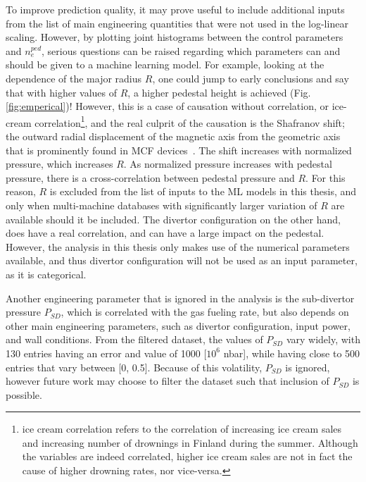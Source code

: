 \documentclass[a4paper, twoside, final, 12pt]{article}
\begin{document}
To improve prediction quality, it may prove useful to include additional inputs from the list of main engineering quantities that were not used in the log-linear scaling.
However, by plotting joint histograms between the control parameters and $n_e^{ped}$, serious questions can be raised regarding which parameters can and should be given to a machine learning model.
For example, looking at the dependence of the major radius $R$, one could jump to early conclusions and say that with higher values of $R$, a higher pedestal height is achieved (Fig. \ref{fig:emperical})!
However, this is a case of causation without correlation, or ice-cream correlation\footnote{ice cream correlation refers to the correlation of increasing ice cream sales and increasing number of drownings in Finland during the summer. Although the variables are indeed correlated, higher ice cream sales are not in fact the cause of higher drowning rates, nor vice-versa.}, and the real culprit of the causation is the Shafranov shift; the outward radial displacement of the magnetic axis from the geometric axis that is prominently found in MCF devices~\cite{shafranov_equilibrium_1963, freidberg_plasma_2007}. The shift increases with normalized pressure, which increases $R$. As normalized pressure increases with pedestal pressure, there is a cross-correlation between pedestal pressure and $R$. For this reason, $R$ is excluded from the list of inputs to the ML models in this thesis, and only when multi-machine databases with significantly larger variation of $R$ are available should it be included.
The divertor configuration on the other hand, does have a real correlation, and can have a large impact on the pedestal. However, the analysis in this thesis only makes use of the numerical parameters available, and thus divertor configuration will not be used as an input parameter, as it is categorical.  

Another engineering parameter that is ignored in the analysis is the sub-divertor pressure $P_{SD}$, which is correlated with the gas fueling rate, but also depends on other main engineering parameters, such as divertor configuration, input power, and wall conditions.
From the filtered dataset, the values of $P_{SD}$ vary widely, with 130 entries having an error and value of 1000 [$10^6$ nbar], while having close to 500 entries that vary between [0, 0.5].
Because of this volatility, $P_{SD}$ is ignored, however future work may choose to filter the dataset such that inclusion of $P_{SD}$ is possible.
\end{document}
